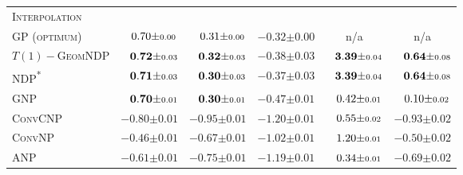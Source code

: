 \begin{table}[h]
\begin{tabular}{lccccc}
		\midrule\multicolumn{6}{l}{\textsc{Interpolation}}                                                                                                                                                                                                                                                           \\[0.5em]
		\scshape GP (optimum)           & $\hphantom{-}0.70 { \pm \scriptstyle 0.00 }$          & $\hphantom{-}0.31 { \pm \scriptstyle 0.00 }$          & $-0.32 { \pm \scriptstyle 0.00 }$          & n/a                                                   & n/a                                                   \\
		\scshape $T(1)-$GeomNDP         & $\hphantom{-}\mathbf{0.72} { \pm \scriptstyle 0.03 }$ & $\hphantom{-}\mathbf{0.32} { \pm \scriptstyle 0.03 }$ & $\mathbf{-0.38} { \pm \scriptstyle 0.03 }$ & $\hphantom{-}\mathbf{3.39} { \pm \scriptstyle 0.04 }$ & $\hphantom{-}\mathbf{0.64} { \pm \scriptstyle 0.08 }$ \\
		\scshape NDP\textsuperscript{*} & $\hphantom{-}\mathbf{0.71} { \pm \scriptstyle 0.03 }$ & $\hphantom{-}\mathbf{0.30} { \pm \scriptstyle 0.03 }$ & $\mathbf{-0.37} { \pm \scriptstyle 0.03 }$ & $\hphantom{-}\mathbf{3.39} { \pm \scriptstyle 0.04 }$ & $\hphantom{-}\mathbf{0.64} { \pm \scriptstyle 0.08 }$ \\
		\scshape GNP                    & $\hphantom{-}\mathbf{0.70} { \pm \scriptstyle 0.01 }$ & $\hphantom{-}\mathbf{0.30} { \pm \scriptstyle 0.01 }$ & $-0.47 { \pm \scriptstyle 0.01 }$          & $\hphantom{-}0.42 { \pm \scriptstyle 0.01 }$          & $\hphantom{-}0.10 { \pm \scriptstyle 0.02 }$          \\
		\scshape ConvCNP                & $-0.80 { \pm \scriptstyle 0.01 }$                     & $-0.95 { \pm \scriptstyle 0.01 }$                     & $-1.20 { \pm \scriptstyle 0.01 }$          & $\hphantom{-}0.55 { \pm \scriptstyle 0.02 }$          & $-0.93 { \pm \scriptstyle 0.02 }$                     \\
		\scshape ConvNP                 & $-0.46 { \pm \scriptstyle 0.01 }$                     & $-0.67 { \pm \scriptstyle 0.01 }$                     & $-1.02 { \pm \scriptstyle 0.01 }$          & $\hphantom{-}1.20 { \pm \scriptstyle 0.01 }$          & $-0.50 { \pm \scriptstyle 0.02 }$                     \\
		\scshape ANP                    & $-0.61 { \pm \scriptstyle 0.01 }$                     & $-0.75 { \pm \scriptstyle 0.01 }$                     & $-1.19 { \pm \scriptstyle 0.01 }$          & $\hphantom{-}0.34 { \pm \scriptstyle 0.01 }$          & $-0.69 { \pm \scriptstyle 0.02 }$                     \\

\end{tabular}
\end{table}
